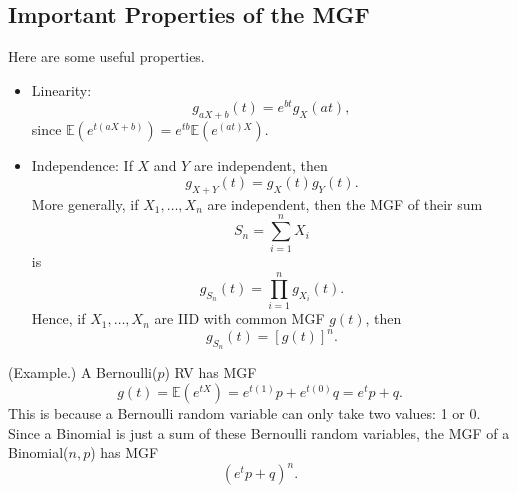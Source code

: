 \documentclass[letterpaper]{article}
\begin{document}
\subsection{Important Properties of the MGF}
Here are some useful properties.
\begin{itemize}
    \item Linearity: 
    \[g_{aX + b}(t) = e^{bt} g_{X}(at),\]
    since $\mathbb{E}(e^{t(aX + b)}) = e^{tb} \mathbb{E}(e^{(at)X}).$

    \item Independence: If $X$ and $Y$ are independent, then
    \[g_{X + Y}(t) = g_{X}(t) g_{Y}(t).\]
    More generally, if $X_1, \dots, X_n$ are independent, then the MGF of their sum \[S_n = \sum_{i = 1}^{n} X_i\] is \[g_{S_n}(t) = \prod_{i = 1}^{n} g_{X_i}(t).\]
    Hence, if $X_1, \dots, X_n$ are IID with common MGF $g(t)$, then 
    \[g_{S_n}(t) = [g(t)]^n.\]
\end{itemize}

\begin{mdframed}[]
    (Example.) A Bernoulli($p$) RV has MGF 
    \[g(t) = \mathbb{E}(e^{tX}) = e^{t(1)}p + e^{t(0)} q = e^t p + q.\]
    This is because a Bernoulli random variable can only take two values: 1 or 0. Since a Binomial is just a sum of these Bernoulli random variables, the MGF of a Binomial($n, p$) has MGF \[(e^t p + q)^n.\]
\end{mdframed}
\end{document}
